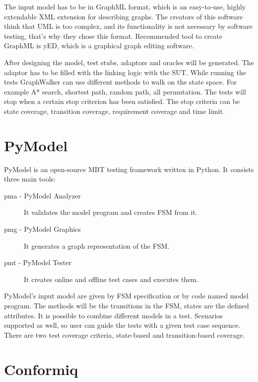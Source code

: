 The input model has to be in GraphML format, which is an easy-to-use, highly extendable XML extension for describing graphs. The creators of this software think that UML is too complex, and its functionality is not necessary by software testing, that's why they chose this format. Recommended tool to create GraphML is yED, which is a graphical graph editing software.

After designing the model, test stubs, adaptors and oracles will be generated. The adaptor has to be filled with the linking logic with the SUT. While running the tests GraphWalker can use different methods to walk on the state space. For example A* search, shortest path, random path, all permutation. The tests will stop when a certain stop criterion has been satisfied. The stop criteria can be state coverage, transition coverage, requirement coverage and time limit.


\section{PyModel}
\label{sec:pymodel}

PyModel \cite{pymodelarticle}\cite{pymodel} is an open-source MBT testing framework written in Python. It consists three main tools:

\begin{description}
	\item[pma - PyModel Analyzer] It validates the model program and creates FSM from it.
    \item[pmg - PyModel Graphics] It generates a graph representation of the FSM.
    \item[pmt - PyModel Tester] It creates online and offline test cases and executes them.
\end{description}

PyModel's input model are given by FSM specification or by code named model program. The methods will be the transitions in the FSM, states are the defined attributes. It is possible to combine different models in a test. Scenarios supported as well, so user can guide the tests with a given test case sequence. There are two test coverage criteria, state-based and transition-based coverage.


\section{Conformiq}
\label{sec:conformiq}

